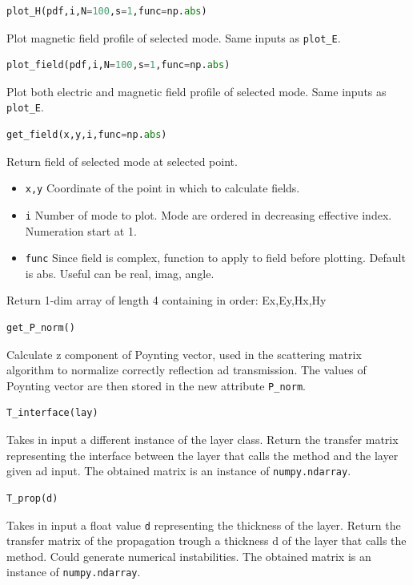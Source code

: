\documentclass[a4paper,10pt]{report}
\begin{document}
\begin{lstlisting}[language=Python,basicstyle=\ttfamily\Large]
plot_H(pdf,i,N=100,s=1,func=np.abs)
\end{lstlisting}
Plot magnetic field profile of selected mode. Same inputs as \texttt{plot\_E}.

\begin{lstlisting}[language=Python,basicstyle=\ttfamily\Large]
plot_field(pdf,i,N=100,s=1,func=np.abs)
\end{lstlisting}
Plot both electric and magnetic field profile of selected mode. Same inputs as \texttt{plot\_E}. 

\begin{lstlisting}[language=Python,basicstyle=\ttfamily\Large]
get_field(x,y,i,func=np.abs)
\end{lstlisting}
Return field of selected mode at selected point. 
\begin{itemize}[noitemsep,topsep=0pt,parsep=0pt,partopsep=0pt]
\item \texttt{x,y} Coordinate of the point in which to calculate fields.
\item \texttt{i} Number of mode to plot. Mode are ordered in decreasing effective index. Numeration start at 1.
\item \texttt{func} Since field is complex, function to apply to field before plotting. Default is abs. Useful can be real, imag, angle. 
\end{itemize}
Return 1-dim array of length 4 containing in order: Ex,Ey,Hx,Hy

\begin{lstlisting}[language=Python,basicstyle=\ttfamily\Large]
get_P_norm()
\end{lstlisting}
Calculate z component of Poynting vector, used in the scattering matrix algorithm to normalize correctly reflection ad transmission.
The values of Poynting vector are then stored in the new attribute \texttt{P\_norm}.

\begin{lstlisting}[language=Python,basicstyle=\ttfamily\Large]
T_interface(lay)
\end{lstlisting}
Takes in input a different instance of the layer class. Return the transfer matrix representing the interface between the layer that calls the method and the layer given ad input.  The obtained matrix is an instance of \texttt{numpy.ndarray}. 

\begin{lstlisting}[language=Python,basicstyle=\ttfamily\Large]
T_prop(d)
\end{lstlisting}
Takes in input a float value \texttt{d} representing the thickness of the layer. Return the transfer matrix of the propagation trough a thickness d of the layer that calls the method. Could generate numerical instabilities.  The obtained matrix is an instance of \texttt{numpy.ndarray}. 
\end{document}
